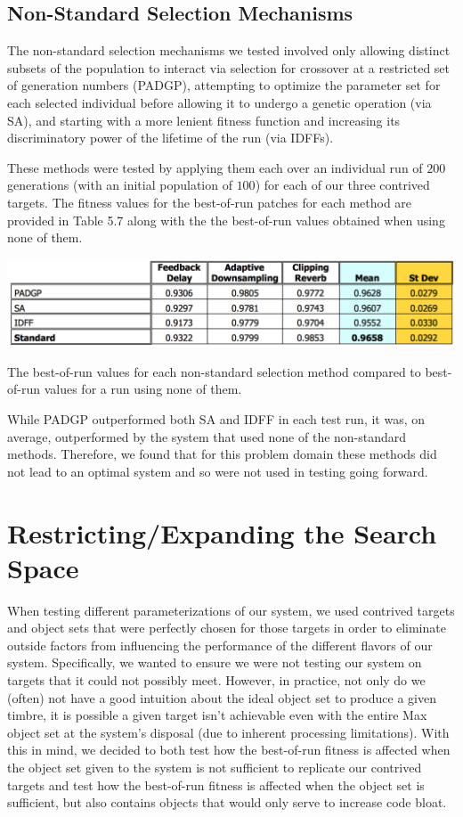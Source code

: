 \documentclass[12pt]{report} 	%
\numberwithin{figure}{chapter}
\numberwithin{table}{chapter}
\numberwithin{equation}{chapter}
\begin{document}
\begin{flushleft}
\subsection{Non-Standard Selection Mechanisms}
The non-standard selection mechanisms we tested involved only allowing distinct subsets of the population to interact via selection for crossover at a restricted set of generation numbers (PADGP), attempting to optimize the parameter set for each selected individual before allowing it to undergo a genetic operation (via SA), and starting with a more lenient fitness function and increasing its discriminatory power of the lifetime of the run (via IDFFs).

These methods were tested by applying them each over an individual run of $200$ generations (with an initial population of $100$) for each of our three contrived targets. The fitness values for the best-of-run patches for each method are provided in Table 5.7 along with the the best-of-run values obtained when using none of them.
\begin{table}[h!]
\begin{center}
\includegraphics[scale=0.6,width=\linewidth]{NonStandardSelectionTable}
\caption[Non-standard selection best-of-run values]{The best-of-run values for each non-standard selection method compared to best-of-run values for a run using none of them.}
\end{center}
\end{table}
While PADGP outperformed both SA and IDFF in each test run, it was, on average, outperformed by the system that used none of the non-standard methods. Therefore, we found that for this problem domain these methods did not lead to an optimal system and so were not used in testing going forward.

\section{Restricting/Expanding the Search Space}
When testing different parameterizations of our system, we used contrived targets and object sets that were perfectly chosen for those targets in order to eliminate outside factors from influencing the performance of the different flavors of our system. Specifically, we wanted to ensure we were not testing our system on targets that it could not possibly meet. However, in practice, not only do we (often) not have a good intuition about the ideal object set to produce a given timbre, it is possible a given target isn't achievable even with the entire Max object set at the system's disposal (due to inherent processing limitations). With this in mind, we decided to both test how the best-of-run fitness is affected when the object set given to the system is not sufficient to replicate our contrived targets and test how the best-of-run fitness is affected when the object set is sufficient, but also contains objects that would only serve to increase code bloat.


\end{flushleft}
\end{document}

